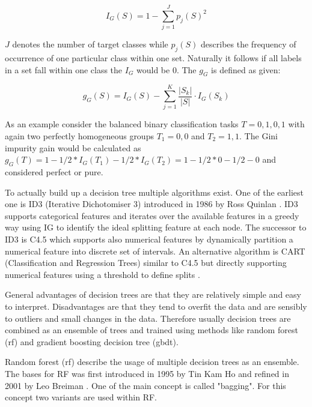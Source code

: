 \documentclass[../main.tex]{subfiles}
\begin{document}
\begin{itemize}
    \begin{equation}
        I_G(S)=1-\sum_{j=1}^{J}p_j(S)^2
    \end{equation}

    $J$ denotes the number of target classes while $p_j(S)$ describes the frequency of occurrence of one particular class within one set.
    Naturally it follows if all labels in a set fall within one class the $I_G$ would be 0. The $g_G$ is defined as given:
    
    \begin{equation}
        g_G(S) = I_G(S) - \sum_{j=1}^K \frac{|S_k|}{|S|} \cdot I_G(S_k)
    \end{equation}
    
    As an example consider the balanced binary classification tasks $T={0,1,0,1}$ with again two perfectly homogeneous groups $T_1={0,0}$ and $T_2={1,1}$. The Gini impurity gain would be calculated as $g_G(T)=1-1/2*I_G(T_1)-1/2*I_G(T_2)=1-1/2*0-1/2-0$ and considered perfect or pure.
\end{itemize}

To actually build up a decision tree multiple algorithms exist. One of the earliest one is ID3 (Iterative Dichotomiser 3) introduced in 1986 by Ross Quinlan \cite{quinlan_induction_1986}. ID3 supports categorical features and iterates over the available features in a greedy way using IG to identify the ideal splitting feature at each node. The successor to ID3 is C4.5 which supports also numerical features by dynamically partition a numerical feature into discrete set of intervals. An alternative algorithm is CART (Classification and Regression Trees) similar to C4.5 but directly supporting numerical features using a threshold to define splits \cite{noauthor_110_nodate}.

General advantages of decision trees are that they are relatively simple and easy to interpret. Disadvantages are that they tend to overfit the data and are sensibly to outliers and small changes in the data. Therefore usually decision trees are combined as an ensemble of trees and trained using methods like random forest (\acs{rf}) and gradient boosting decision tree (\acs{gbdt}).

 \label{par:rf}

Random forest (\acs{rf}) describe the usage of multiple decision trees as an ensemble. The bases for RF was first introduced in 1995 by Tin Kam Ho \cite{ho_random_1998} and refined in 2001 by Leo Breiman \cite{breiman_random_2001}. One of the main concept is called "bagging". For this concept two variants are used within RF.
\end{document}

